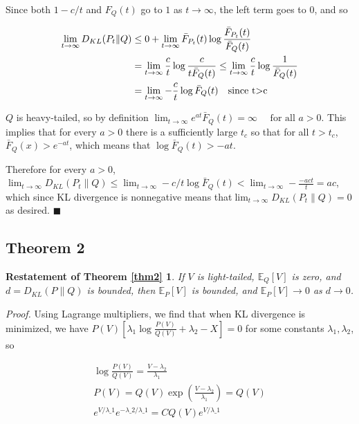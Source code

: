 \documentclass{article}
\begin{document}
Since both \(1-c/t\) and \(F_Q(t)\) go to \(1\) as \(t \to \infty\), the
left term goes to \(0\), and so

\begin{align*}\lim_{t \to \infty} D_{KL}(P_t \| Q)&\le 0 + \lim_{t \to \infty}\bar F_{P_t}(t) \log \frac{\bar F_{P_t}(t)
}{\bar F_Q(t)}
\\ & = \lim_{t \to \infty}\frac c t \log \frac c {t \bar F_Q(t)} \le \lim_{t \to \infty} \frac c t \log \frac 1 {\bar F_Q(t)} 
\\&= \lim_{t \to \infty}-\frac c t \log \bar F_Q(t) \text{\quad since t>c}
\end{align*}

\(Q\) is heavy-tailed, so by definition
\(\lim _{t \rightarrow \infty} e^{a t} \bar{F}_Q(t)=\infty \quad \text { for all } a>0\).
This implies that for every \(a > 0\) there is a sufficiently large
\(t_{c}\) so that for all \(t > t_c\), \(\bar F_Q(x) > e^{-at}\), which
means that \(\log \bar F_Q(t) > -a t\).

Therefore for every \(a > 0\),
\(\lim_{t \to \infty} D_{KL}(P_t \| Q) \le \lim_{t \to \infty} -c/t \log \bar F_Q(t) < \lim_{t \to \infty} -\frac {-act} t = ac\),
which since KL divergence is nonnegative means
that\(\lim_{t \to \infty} D_{KL}(P_t \| Q) = 0\) as desired.
\(\blacksquare\)


\subsection{Theorem 2}
\newtheorem*{theorem2}{Restatement of Theorem \ref{thm2}}
\begin{theorem2} If \(V\) is light-tailed, \(\mathbb E_Q[V]\)
is zero, and \(d = D_{KL}(P \| Q)\) is bounded, then
\(\mathbb E_P[V]\) is bounded, and \(\mathbb E_P[V] \to 0\) as
\(d \to 0\).
\end{theorem2}

\emph{Proof.} Using Lagrange multipliers, we find that when KL divergence is
minimized, we have
\(P(V) [\lambda_1 \log \frac{P(V)}{Q(V)} + \lambda_2 - X] = 0\) for some
constants \(\lambda_1, \lambda_2\), so

\begin{align}\log \frac{P(V)}{Q(V)} = \frac{V - \lambda_2}{\lambda_1}
\\ P(V) = Q(V)\exp\left(\frac{V - \lambda_2}{\lambda_1}\right) = Q(V)
\\ e^{V/\lambda\_1} e^{-\lambda\_2/\lambda\_1} = C Q(V)
e^{V/\lambda\_1}
\end{align}
\end{document}
